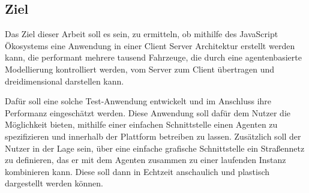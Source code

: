 \subsection{Ziel}

Das Ziel dieser Arbeit soll es sein, zu ermitteln, ob mithilfe des JavaScript Ökosystems eine Anwendung in einer Client Server Architektur erstellt werden kann, die performant mehrere tausend Fahrzeuge, die durch eine agentenbasierte Modellierung kontrolliert werden, vom Server zum Client übertragen und dreidimensional darstellen kann.

Dafür soll eine solche Test-Anwendung entwickelt und im Anschluss ihre Performanz eingeschätzt werden.
Diese Anwendung soll dafür dem Nutzer die Möglichkeit bieten, mithilfe einer einfachen Schnittstelle einen Agenten zu spezifizieren und innerhalb der Plattform betreiben zu lassen.
Zusätzlich soll der Nutzer in der Lage sein, über eine einfache grafische Schnittstelle ein Straßennetz zu definieren, das er mit dem Agenten zusammen zu einer laufenden Instanz kombinieren kann.
Diese soll dann in Echtzeit anschaulich und plastisch dargestellt werden können.
